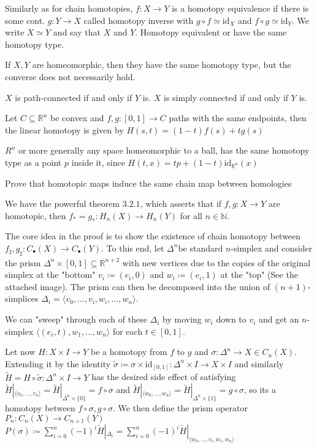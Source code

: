 Similarly as for chain homotopies, \( f : X \to Y \) is a homotopy equivalence if there is some cont. \( g : Y \to X \)
called homotopy inverse with \( g \circ f \simeq \text{id}_X \) and \( f \circ g \simeq \text{id}_{Y} \).
We write \( X \simeq Y \) and say that \( X \) and \( Y \). Homotopy equivalent or have the
same homotopy type.

If \( X, Y \) are homeomorphic, then they have the same homotopy type, but the converse does not necessarily hold.

\( X \) is path-connected if and only if \( Y \) is.
\( X \) is simply connected if and only if \( Y \) is.

Let \( C \subseteq \mathbb{R}^n \) be convex and \( f, g : [0, 1] \to C \) paths with the same endpoints, then the
linear homotopy is given by
\( H(s, t) = (1-t)f(s) + tg(s) \)

\( R^n \) or more generally any space homeomorphic to a ball, has the same homotopy type as a point \( p \) inside it, since
\( H(t, x) = tp + (1-t)\text{id}_{\mathbb{R}^n}(x) \)

Prove that homotopic maps induce the same chain map between homologies

We have the powerful theorem \( 3.2.1 \), which asserts that if \( f,g : X \to Y \) are homotopic,
then \( f_{\ast} = g_{\ast} : H_n(X) \to H_n(Y) \) for all \( n \in \mathbb{N} \).

The core idea in the proof is to show the existence of chain homotopy between \( f_{\sharp},g_{\sharp} : C_\bullet(X) \to C_\bullet(Y) \).
To this end, let \( \Delta^n \)be standard \( n \)-simplex and consider the prism \(\Delta^n \times [0, 1] \subseteq \mathbb{R}^{n+2} \)
with new vertices due to the copies of the original simplex at the "bottom" \( v_i \coloneqq  (e_i, 0) \) and \( w_i \coloneqq  (e_i, 1) \) at the "top"
(See the attached image). The prism can then be decomposed into the union of \( (n+1) \)-simplices \( \Delta_i = \langle v_0, \dots, v_i, w_i, \dots, w_n \rangle \).

We can "sweep" through each of these \( \Delta_i \) by moving \( w_i \) down to \( v_i \) and get an \( n \)-simplex
\(\langle (e_i, t), w_1, \dots, w_n \rangle \) for each \( t \in [0, 1] \).

Let now \( H : X \times I \to Y\) be a homotopy from \( f \) to \( g \) and \( \sigma : \Delta^n \to X \in C_n(X) \).
Extending it by the identity \( \tilde{\sigma} \coloneqq \sigma \times \text{id}_{[0, 1]} : \Delta^n \times I \to X \times I \)
and similarly \( \tilde{H} = H \circ \tilde{\sigma} : \Delta^n \times I \to Y \) has the desired side effect of satisfying
\( \tilde{H}|_{\langle v_0, \dots, v_n\rangle} = \tilde{H}|_{\Delta^n \times \{0\}} = f \circ \sigma \) and 
\( \tilde{H}|_{\langle w_0, \dots, w_n\rangle} = \tilde{H}|_{\Delta^n \times \{1\}} = g \circ \sigma \),
so its a homotopy between \( f \circ \sigma, g \circ \sigma \). 
We then define the prism operator \( P_n : C_n(X) \to C_{n+1}(Y) \)
\( P(\sigma) \coloneqq \sum_{i=0}^n (-1)^i \tilde{H}|_{\Delta_i} = \sum_{i=0}^n (-1)^i \tilde{H}|_{\langle w_0, \dots, v_i, w_i, w_n\rangle}\)

